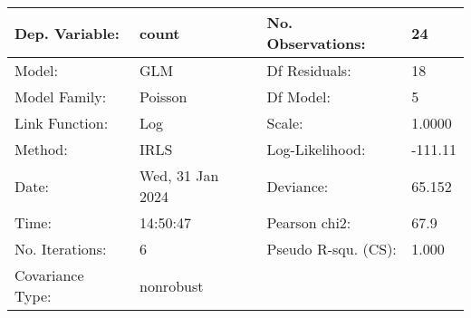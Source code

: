 \begin{tabular}{llll}
\toprule
Dep. Variable: & count &   No. Observations:   &     24 \\
\midrule
Model: & GLM &   Df Residuals:       &     18 \\
Model Family: & Poisson &   Df Model:           &      5 \\
Link Function: & Log &   Scale:              &   1.0000 \\
Method: & IRLS &   Log-Likelihood:     &  -111.11 \\
Date: & Wed, 31 Jan 2024 &   Deviance:           &   65.152 \\
Time: & 14:50:47 &   Pearson chi2:       &   67.9 \\
No. Iterations: & 6 &   Pseudo R-squ. (CS): &  1.000 \\
Covariance Type: & nonrobust &                       &   \\
\bottomrule
\end{tabular}
